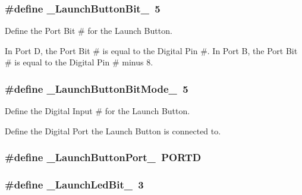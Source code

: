 \hypertarget{remotePanel_8ino_a7790df90c3031037ccd5b55d84e32858}{
\subsubsection[{\-\_\-\-Launch\-Button\-Bit\-\_\-}]{\setlength{\rightskip}{0pt plus 5cm}\#define {\bf \-\_\-\-Launch\-Button\-Bit\-\_\-}~5}}\label{remotePanel_8ino_a7790df90c3031037ccd5b55d84e32858}


\-Define the \-Port \-Bit \# for the \-Launch \-Button. 

\-In \-Port \-D, the \-Port \-Bit \# is equal to the \-Digital \-Pin \#. \-In \-Port \-B, the \-Port \-Bit \# is equal to the \-Digital \-Pin \# minus 8. \hypertarget{remotePanel_8ino_adb250c5295e5075c2a2ba25ff9ea5f57}{
\subsubsection[{\-\_\-\-Launch\-Button\-Bit\-Mode\-\_\-}]{\setlength{\rightskip}{0pt plus 5cm}\#define {\bf \-\_\-\-Launch\-Button\-Bit\-Mode\-\_\-}~5}}\label{remotePanel_8ino_adb250c5295e5075c2a2ba25ff9ea5f57}


\-Define the \-Digital \-Input \# for the \-Launch \-Button. 

\-Define the \-Digital \-Port the \-Launch \-Button is connected to. \hypertarget{remotePanel_8ino_aa27235b645c2cb89f868e08287f54dc6}{
\subsubsection[{\-\_\-\-Launch\-Button\-Port\-\_\-}]{\setlength{\rightskip}{0pt plus 5cm}\#define {\bf \-\_\-\-Launch\-Button\-Port\-\_\-}~\-P\-O\-R\-T\-D}}\label{remotePanel_8ino_aa27235b645c2cb89f868e08287f54dc6}
\hypertarget{remotePanel_8ino_a556344e1154b17e67f5c8a40e022be29}{
\subsubsection[{\-\_\-\-Launch\-Led\-Bit\-\_\-}]{\setlength{\rightskip}{0pt plus 5cm}\#define {\bf \-\_\-\-Launch\-Led\-Bit\-\_\-}~3}}\label{remotePanel_8ino_a556344e1154b17e67f5c8a40e022be29}


